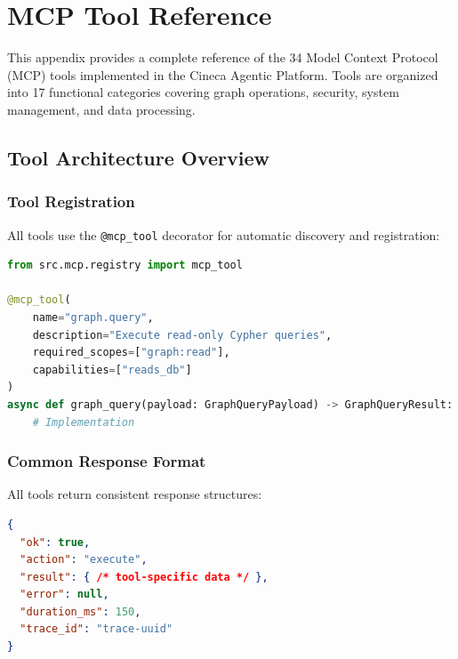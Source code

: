 
\chapter{MCP Tool Reference}
\label{app:tool-reference}

This appendix provides a complete reference of the 34 Model Context Protocol (MCP) tools implemented in the Cineca Agentic Platform. Tools are organized into 17 functional categories covering graph operations, security, system management, and data processing.

\section{Tool Architecture Overview}
\label{app:tools:overview}

\subsection{Tool Registration}

All tools use the \texttt{@mcp\_tool} decorator for automatic discovery and registration:

\begin{lstlisting}[language=Python]
from src.mcp.registry import mcp_tool

@mcp_tool(
    name="graph.query",
    description="Execute read-only Cypher queries",
    required_scopes=["graph:read"],
    capabilities=["reads_db"]
)
async def graph_query(payload: GraphQueryPayload) -> GraphQueryResult:
    # Implementation
\end{lstlisting}

\subsection{Common Response Format}

All tools return consistent response structures:

\begin{lstlisting}[language=json]
{
  "ok": true,
  "action": "execute",
  "result": { /* tool-specific data */ },
  "error": null,
  "duration_ms": 150,
  "trace_id": "trace-uuid"
}
\end{lstlisting}

